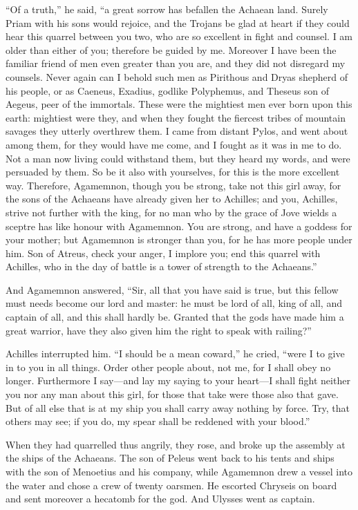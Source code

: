 “Of a truth,” he said, “a great sorrow has befallen the Achaean land.
Surely Priam with his sons would rejoice, and the Trojans be glad at heart
if they could hear this quarrel between you two, who are so excellent in
fight and counsel. I am older than either of you; therefore be guided by
me. Moreover I have been the familiar friend of men even greater than you
are, and they did not disregard my counsels. Never again can I behold such
men as Pirithous and Dryas shepherd of his people, or as Caeneus, Exadius,
godlike Polyphemus, and Theseus son of Aegeus, peer of the immortals.
These were the mightiest men ever born upon this earth: mightiest were
they, and when they fought the fiercest tribes of mountain savages they
utterly overthrew them. I came from distant Pylos, and went about among
them, for they would have me come, and I fought as it was in me to do. Not
a man now living could withstand them, but they heard my words, and were
persuaded by them. So be it also with yourselves, for this is the more
excellent way. Therefore, Agamemnon, though you be strong, take not this
girl away, for the sons of the Achaeans have already given her to
Achilles; and you, Achilles, strive not further with the king, for no man
who by the grace of Jove wields a sceptre has like honour with Agamemnon.
You are strong, and have a goddess for your mother; but Agamemnon is
stronger than you, for he has more people under him. Son of Atreus, check
your anger, I implore you; end this quarrel with Achilles, who in the day
of battle is a tower of strength to the Achaeans.”

And Agamemnon answered, “Sir, all that you have said is true, but this
fellow must needs become our lord and master: he must be lord of all, king
of all, and captain of all, and this shall hardly be. Granted that the
gods have made him a great warrior, have they also given him the right to
speak with railing?”

Achilles interrupted him. “I should be a mean coward,” he cried, “were I
to give in to you in all things. Order other people about, not me, for I
shall obey no longer. Furthermore I say—and lay my saying to your
heart—I shall fight neither you nor any man about this girl, for
those that take were those also that gave. But of all else that is at my
ship you shall carry away nothing by force. Try, that others may see; if
you do, my spear shall be reddened with your blood.”

When they had quarrelled thus angrily, they rose, and broke up the
assembly at the ships of the Achaeans. The son of Peleus went back to his
tents and ships with the son of Menoetius and his company, while Agamemnon
drew a vessel into the water and chose a crew of twenty oarsmen. He
escorted Chryseis on board and sent moreover a hecatomb for the god. And
Ulysses went as captain.

